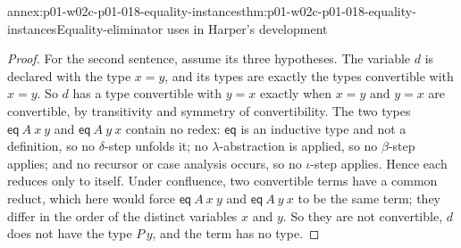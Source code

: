 \begin{annexitem}{annex:p01-w02c-p01-018-equality-instances}{thm:p01-w02c-p01-018-equality-instances}{Equality-eliminator uses in Harper's development}
\begin{proof}
For the second sentence, assume its three hypotheses.  The variable \(d\)
is declared with the type \(x=y\), and its types are exactly the types
convertible with \(x=y\).  So \(d\) has a type convertible with \(y=x\)
exactly when \(x=y\) and \(y=x\) are convertible, by transitivity and
symmetry of convertibility.  The two types \(\mathsf{eq}\ A\ x\ y\) and
\(\mathsf{eq}\ A\ y\ x\) contain no redex: \(\mathsf{eq}\) is an inductive
type and not a definition, so no \(\delta\)-step unfolds it; no
\(\lambda\)-abstraction is applied, so no \(\beta\)-step applies; and no
recursor or case analysis occurs, so no \(\iota\)-step applies.  Hence
each reduces only to itself.  Under confluence, two convertible terms have
a common reduct, which here would force
\(\mathsf{eq}\ A\ x\ y\) and \(\mathsf{eq}\ A\ y\ x\) to be the same term;
they differ in the order of the distinct variables \(x\) and \(y\).  So
they are not convertible, \(d\) does not have the type \(P\,y\), and the
term has no type.
\end{proof}
\end{annexitem}
